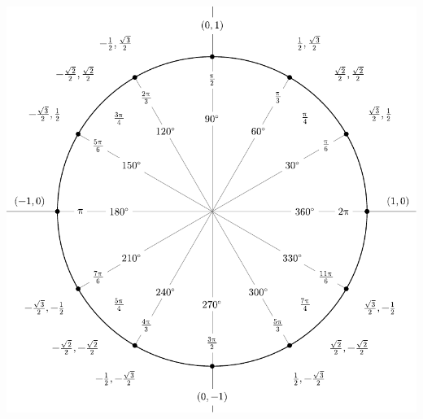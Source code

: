 \documentclass[7pt,landscape, margin = 0.1mm]{article}
\begin{document}
\begin{multicols}{4}
\begin{flushleft}
\includegraphics[scale=0.5]{build/pictures/degrees_circle.pdf} 


\end{flushleft}


   \end{multicols}
\end{document}
